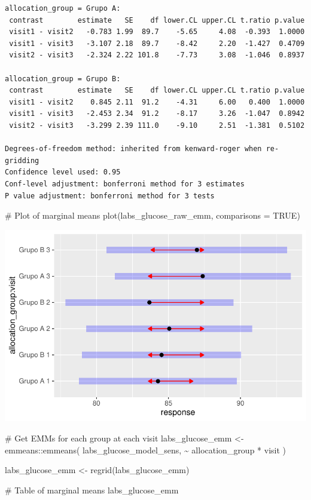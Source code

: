 \documentclass[
  letterpaper,
  DIV=11,
  numbers=noendperiod]{scrartcl}
\newenvironment{Shaded}{\begin{snugshade}}{\end{snugshade}}
\newcommand{\AttributeTok}[1]{\textcolor[rgb]{0.40,0.45,0.13}{#1}}
\newcommand{\CommentTok}[1]{\textcolor[rgb]{0.37,0.37,0.37}{#1}}
\newcommand{\ConstantTok}[1]{\textcolor[rgb]{0.56,0.35,0.01}{#1}}
\newcommand{\FunctionTok}[1]{\textcolor[rgb]{0.28,0.35,0.67}{#1}}
\newcommand{\NormalTok}[1]{\textcolor[rgb]{0.00,0.23,0.31}{#1}}
\newcommand{\OtherTok}[1]{\textcolor[rgb]{0.00,0.23,0.31}{#1}}
\newcommand{\SpecialCharTok}[1]{\textcolor[rgb]{0.37,0.37,0.37}{#1}}
\begin{document}
\begin{verbatim}
allocation_group = Grupo A:
 contrast        estimate   SE    df lower.CL upper.CL t.ratio p.value
 visit1 - visit2   -0.783 1.99  89.7    -5.65     4.08  -0.393  1.0000
 visit1 - visit3   -3.107 2.18  89.7    -8.42     2.20  -1.427  0.4709
 visit2 - visit3   -2.324 2.22 101.8    -7.73     3.08  -1.046  0.8937

allocation_group = Grupo B:
 contrast        estimate   SE    df lower.CL upper.CL t.ratio p.value
 visit1 - visit2    0.845 2.11  91.2    -4.31     6.00   0.400  1.0000
 visit1 - visit3   -2.453 2.34  91.2    -8.17     3.26  -1.047  0.8942
 visit2 - visit3   -3.299 2.39 111.0    -9.10     2.51  -1.381  0.5102

Degrees-of-freedom method: inherited from kenward-roger when re-gridding 
Confidence level used: 0.95 
Conf-level adjustment: bonferroni method for 3 estimates 
P value adjustment: bonferroni method for 3 tests 
\end{verbatim}

\begin{Shaded}
\begin{Highlighting}[]
\CommentTok{\# Plot of marginal means}
\FunctionTok{plot}\NormalTok{(labs\_glucose\_raw\_emm, }\AttributeTok{comparisons =} \ConstantTok{TRUE}\NormalTok{)}
\end{Highlighting}
\end{Shaded}

\includegraphics{Outcomes_V1V2V3_files/figure-pdf/labs_glucose_raw_emm-1.pdf}

\begin{Shaded}
\begin{Highlighting}[]
\CommentTok{\# Get EMMs for each group at each visit}
\NormalTok{labs\_glucose\_emm }\OtherTok{\textless{}{-}}\NormalTok{ emmeans}\SpecialCharTok{::}\FunctionTok{emmeans}\NormalTok{(}
\NormalTok{    labs\_glucose\_model\_sens, }
    \SpecialCharTok{\textasciitilde{}}\NormalTok{ allocation\_group }\SpecialCharTok{*}\NormalTok{ visit}
\NormalTok{)}

\NormalTok{labs\_glucose\_emm }\OtherTok{\textless{}{-}} \FunctionTok{regrid}\NormalTok{(labs\_glucose\_emm)}

\CommentTok{\# Table of marginal means}
\NormalTok{labs\_glucose\_emm}
\end{Highlighting}
\end{Shaded}
\end{document}
